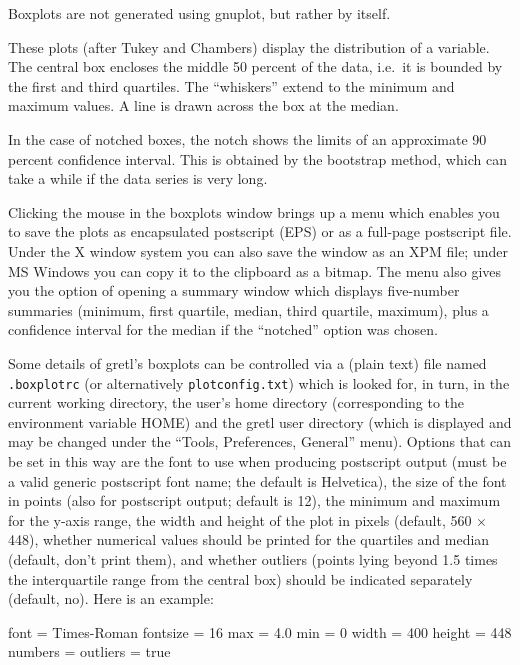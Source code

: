 Boxplots are not generated using gnuplot, but rather by 
itself.

These plots (after Tukey and Chambers) display the distribution
of a variable. The central box encloses the middle 50 percent of the
data, i.e.\ it is bounded by the first and third quartiles.  The
``whiskers'' extend to the minimum and maximum values.  A line is
drawn across the box at the median.

In the case of notched boxes, the notch shows the limits of an
approximate 90 percent confidence interval.  This is obtained by the
bootstrap method, which can take a while if the data series is very
long.

Clicking the mouse in the boxplots window brings up a menu which
enables you to save the plots as encapsulated postscript (EPS) or as a
full-page postscript file.  Under the X window system you can also
save the window as an XPM file; under MS Windows you can copy it to
the clipboard as a bitmap.  The menu also gives you the option of
opening a summary window which displays five-number summaries
(minimum, first quartile, median, third quartile, maximum), plus a
confidence interval for the median if the ``notched'' option was
chosen.  

Some details of gretl's boxplots can be controlled via a (plain text)
file named \verb+.boxplotrc+ (or alternatively \verb+plotconfig.txt+)
which is looked for, in turn, in the current working directory, the
user's home directory (corresponding to the environment variable HOME)
and the gretl user directory (which is displayed and may be changed
under the ``Tools, Preferences, General'' menu).  Options that can be
set in this way are the font to use when producing postscript output
(must be a valid generic postscript font name; the default is
Helvetica), the size of the font in points (also for postscript
output; default is 12), the minimum and maximum for the y-axis range,
the width and height of the plot in pixels (default, 560 $\times$ 448),
whether numerical values should be printed for the quartiles and
median (default, don't print them), and whether outliers (points lying
beyond 1.5 times the interquartile range from the central box) should
be indicated separately (default, no).  Here is an example:

\begin{code}
font = Times-Roman
fontsize = 16
max = 4.0
min = 0
width = 400
height = 448
numbers = %
outliers = true
\end{code}

